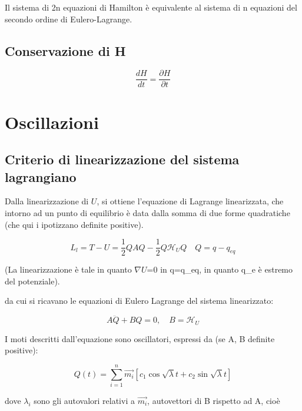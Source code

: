 \documentclass{article}
\begin{document}
            Il sistema di 2n equazioni di Hamilton è equivalente al sistema di n equazioni del secondo ordine di Eulero-Lagrange.

            \subsection{Conservazione di H}

            \begin{equation}
                \frac{d H}{dt}= \frac{\partial H}{\partial t}
            \end{equation}


            \section{Oscillazioni}
            \subsection{Criterio di linearizzazione del sistema lagrangiano}
            Dalla linearizzazione di $U$, si ottiene l'equazione di Lagrange linearizzata, che intorno ad un punto di equilibrio è data dalla somma di due forme quadratiche (che qui i ipotizzano definite positive).

            \begin{equation}
                L_l=T-U= \frac{1}{2}QAQ- \frac{1}{2}Q\mathcal{H}_UQ \quad Q=q-q_{eq}
            \end{equation}

            (La linearizzazione è tale in quanto $\nabla$$U$=0 in q=q\_{eq}, in quanto q\_e è estremo del potenziale).

        da cui si ricavano le equazioni di Eulero Lagrange del sistema linearizzato:

        \begin{equation}
            A\ddot{Q} + BQ = 0, \quad B = \mathcal{H}_U
        \end{equation}

        I moti descritti dall'equazione sono oscillatori, espressi da (se A, B definite positive):

        \begin{equation}
            Q(t)=\sum_{i=1}^n \vec{m_i}[c_1 \cos{\sqrt{\lambda}t}+c_2 \sin{\sqrt{\lambda}t}]
        \end{equation}

        dove $\lambda_i$ sono gli autovalori relativi a $\Vec{m_i}$, autovettori di B rispetto ad A, cioè
\end{document}
